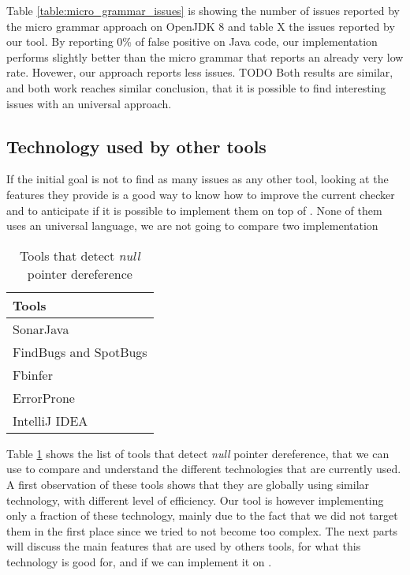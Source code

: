 Table \ref{table:micro_grammar_issues} is showing the number of issues reported by the micro grammar approach on OpenJDK 8 and table X the issues reported by our tool.
By reporting 0\% of false positive on Java code, our implementation performs slightly better than the micro grammar that reports an already very low rate.
Hovewer, our approach reports less issues. TODO
Both results are similar, and both work reaches similar conclusion, that it is possible to find interesting issues with an universal approach.

\subsection{Technology used by other tools}
\label{subsec:other_tools_technology}

If the initial goal is not to find as many issues as any other tool, looking at the features they provide is a good way to know how to improve the current checker and to anticipate if it is possible to implement them on top of \slang{}.
None of them uses an universal language, we are not going to compare two implementation


\begin{table}[h]
	\centering
	\caption{Tools that detect \emph{null} pointer dereference}
	\label{table:tools_features}
	\begin{tabular}{|l|}
		\hline
		\bf Tools \\
		\hline
		SonarJava \cite{SonarJava:2019:Online} \\
		FindBugs \cite{Hovemeyer:2004:FBE:1052883.1052895} and SpotBugs \cite{spotBugs:2019:Online} \\
		Fbinfer \cite{fbInfer:2019:Online} \\
		ErrorProne \cite{errorProne:2019:Online} \\
		IntelliJ IDEA \cite{intelJIDEA:2019:Online} \\
		\hline    
	\end{tabular}
\end{table}

Table \ref{table:tools_features} shows the list of tools that detect \emph{null} pointer dereference, that we can use to compare and understand the different technologies that are currently used.
A first observation of these tools shows that they are globally using similar technology, with different level of efficiency.
Our tool is however implementing only a fraction of these technology, mainly due to the fact that we did not target them in the first place since we tried to not become too complex. 
The next parts will discuss the main features that are used by others tools, for what this technology is good for, and if we can implement it on \slang{}.

